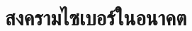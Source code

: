 \documentclass[../th_cyber_warfare_distilled.tex]{subfiles}
\begin{document}
\chapter{สงครามไซเบอร์ในอนาคต}
 
\end{document}
